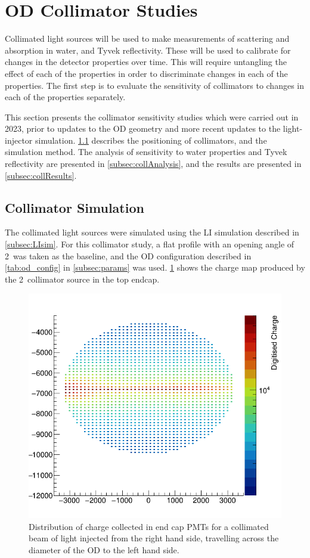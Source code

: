 \documentclass[a4paper,11pt]{article}
\begin{document}
\section{OD Collimator Studies}\label{sec:collimator_studies}

Collimated light sources will be used to make measurements of scattering and absorption in water, and Tyvek reflectivity. These will be used to calibrate for changes in the detector properties over time. This will require untangling the effect of each of the properties in order to discriminate changes in each of the properties. The first step is to evaluate the sensitivity of collimators to changes in each of the properties separately. 

This section presents the collimator sensitivity studies which were carried out in 2023, prior to updates to the OD geometry and more recent updates to the light-injector simulation. \cref{subsec:collSim} describes the positioning of collimators, and the simulation method. The analysis of sensitivity to water properties and Tyvek reflectivity are presented in \cref{subsec:collAnalysis}, and the results are presented in \cref{subsec:collResults}.

\subsection{Collimator Simulation}\label{subsec:collSim}

The collimated light sources were simulated using the LI simulation described in \cref{subsec:LIsim}. For this collimator study, a flat profile with an opening angle of 2\textdegree~was taken as the baseline, and the OD configuration described in \cref{tab:od_config} in \cref{subsec:params} was used. \cref{fig:collMap} shows the charge map produced by the 2\textdegree~collimator source in the top endcap.

 \begin{figure}[ht!]
     \centering
     \includegraphics[width=0.5\linewidth]{hitmapColl.png}
     \caption{Distribution of charge collected in end cap PMTs for a collimated
beam of light injected from the right hand side, travelling across the diameter of the OD to the left hand side.}
     \label{fig:collMap}
 \end{figure}
\end{document}
